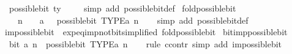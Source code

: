\begin{isabellebody}
\ \ {\isachardoublequoteopen}possible{\isacharunderscore}{\kern0pt}bit\ ty\ {}{\isachardoublequoteclose}\isanewline
%
\isadelimproof
\ \ %
\endisadelimproof
%
\isatagproof
{}\isamarkupfalse%
\ {\isacharparenleft}{\kern0pt}simp\ add{\isacharcolon}{\kern0pt}\ possible{\isacharunderscore}{\kern0pt}bit{\isacharunderscore}{\kern0pt}def{\isacharparenright}{\kern0pt}%
\endisatagproof
{\isafoldproof}%
%
\isadelimproof
\isanewline
%
\endisadelimproof
\isanewline
{}\isamarkupfalse%
\ fold{\isacharunderscore}{\kern0pt}possible{\isacharunderscore}{\kern0pt}bit{\isacharcolon}{\kern0pt}\isanewline
\ \ {\isachardoublequoteopen}{}\ {\isacharcircum}{\kern0pt}\ n\ {\isacharequal}{\kern0pt}\ {\isacharparenleft}{\kern0pt}{}\ {\isacharcolon}{\kern0pt}{\isacharcolon}{\kern0pt}\ {\isacharprime}{\kern0pt}a{\isacharparenright}{\kern0pt}\ {\isasymlongleftrightarrow}\ {\isasymnot}\ possible{\isacharunderscore}{\kern0pt}bit\ TYPE{\isacharparenleft}{\kern0pt}{\isacharprime}{\kern0pt}a{\isacharparenright}{\kern0pt}\ n{\isachardoublequoteclose}\isanewline
%
\isadelimproof
\ \ %
\endisadelimproof
%
\isatagproof
{}\isamarkupfalse%
\ {\isacharparenleft}{\kern0pt}simp\ add{\isacharcolon}{\kern0pt}\ possible{\isacharunderscore}{\kern0pt}bit{\isacharunderscore}{\kern0pt}def{\isacharparenright}{\kern0pt}%
\endisatagproof
{\isafoldproof}%
%
\isadelimproof
\isanewline
%
\endisadelimproof
\isanewline
{}\isamarkupfalse%
\ impossible{\isacharunderscore}{\kern0pt}bit\ {\isacharequal}{\kern0pt}\ exp{\isacharunderscore}{\kern0pt}eq{\isacharunderscore}{\kern0pt}{}{\isacharunderscore}{\kern0pt}imp{\isacharunderscore}{\kern0pt}not{\isacharunderscore}{\kern0pt}bit{\isacharbrackleft}{\kern0pt}simplified\ fold{\isacharunderscore}{\kern0pt}possible{\isacharunderscore}{\kern0pt}bit{\isacharbrackright}{\kern0pt}\isanewline
\isanewline
{}\isamarkupfalse%
\ bit{\isacharunderscore}{\kern0pt}imp{\isacharunderscore}{\kern0pt}possible{\isacharunderscore}{\kern0pt}bit{\isacharcolon}{\kern0pt}\isanewline
\ \ {\isachardoublequoteopen}bit\ a\ n\ {\isasymLongrightarrow}\ possible{\isacharunderscore}{\kern0pt}bit\ TYPE{\isacharparenleft}{\kern0pt}{\isacharprime}{\kern0pt}a{\isacharparenright}{\kern0pt}\ n{\isachardoublequoteclose}\isanewline
%
\isadelimproof
\ \ %
\endisadelimproof
%
\isatagproof
{}\isamarkupfalse%
\ {\isacharparenleft}{\kern0pt}rule\ ccontr{\isacharparenright}{\kern0pt}\ {\isacharparenleft}{\kern0pt}simp\ add{\isacharcolon}{\kern0pt}\ impossible{\isacharunderscore}{\kern0pt}bit{\isacharparenright}{\kern0pt}%

\end{isabellebody}
